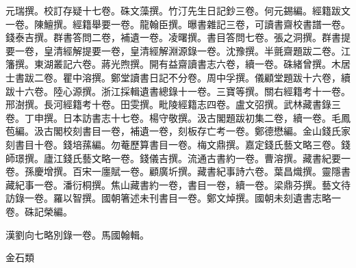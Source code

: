 \begin{pinyinscope}
元瑞撰。校訂存疑十七卷。硃文藻撰。竹汀先生日記鈔三卷。何元錫編。經籍跋文一卷。陳鱣撰。經籍舉要一卷。龍翰臣撰。曝書雜記三卷，可讀書齋校書譜一卷。錢泰吉撰。群書答問二卷，補遺一卷。凌曙撰。書目答問七卷。張之洞撰。群書提要一卷，皇清經解提要一卷，皇清經解淵源錄一卷。沈豫撰。半氈齋題跋二卷。江籓撰。東湖叢記六卷。蔣光煦撰。開有益齋讀書志六卷，續一卷。硃緒曾撰。木居士書跋二卷。瞿中溶撰。鄭堂讀書日記不分卷。周中孚撰。儀顧堂題跋十六卷，續跋十六卷。陸心源撰。浙江採輯遺書總錄十一卷。三寶等撰。關右經籍考十一卷。邢澍撰。長河經籍考十卷。田雯撰。毗陵經籍志四卷。盧文弨撰。武林藏書錄三卷。丁申撰。日本訪書志十七卷。楊守敬撰。汲古閣題跋初集二卷，續一卷。毛鳳苞編。汲古閣校刻書目一卷，補遺一卷，刻板存亡考一卷。鄭德懋編。金山錢氏家刻書目十卷。錢培蓀編。勿菴歷算書目一卷。梅文鼎撰。嘉定錢氏藝文略三卷。錢師璟撰。廬江錢氏藝文略一卷。錢儀吉撰。流通古書約一卷。曹溶撰。藏書紀要一卷。孫慶增撰。百宋一廛賦一卷。顧廣圻撰。藏書紀事詩六卷。葉昌熾撰。靈隱書藏紀事一卷。潘衍桐撰。焦山藏書約一卷，書目一卷，續一卷。梁鼎芬撰。藝文待訪錄一卷。羅以智撰。國朝箸述未刊書目一卷。鄭文焯撰。國朝未刻遺書志略一卷。硃記榮編。

漢劉向七略別錄一卷。馬國翰輯。

金石類


\end{pinyinscope}
